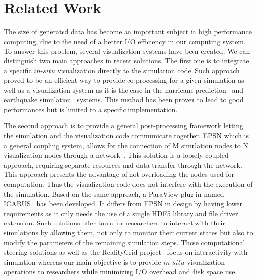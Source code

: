 \section{Related Work}
\label{sec:related}

The size of generated data has become an important subject in high performance 
computing, due to the need of a better I/O efficiency in our computing 
system. To answer this problem, several visualization systems have been created.
We can distinguish two main approaches in recent solutions. The first one is to 
integrate a specific $in$-$situ$ visualization directly to the simulation code. 
Such approach proved to be an efficient way to provide co-processing for a given
simulation as well as a visualization system as it is the case in the hurricane
prediction~\cite{4015457} and earthquake simulation~\cite{4090186} systems.
This method has been proven to lead to good performances but is limited 
to a specific implementation.

The second approach is to provide a general post-processing framework letting the
simulation and the visualization code communicate together. EPSN which is a
general coupling system, allows for the connection of M simulation nodes to N
visualization nodes through a network~\cite{4020782}. This solution is a
loosely coupled approach, requiring separate resources and data transfer
through the network. This approach presents the advantage of not overloading
the nodes used for computation. Thus the visualization code does not interfere
with the execution of the simulation. Based on the same approach, a ParaView
plug-in named ICARUS~\cite{6152102} has been developed. 
It differs from EPSN in design by having lower requirements as it only needs
the use of a single HDF5 library and file driver extension. Such solutions
offer tools for researchers to interact with their simulations by allowing
them, not only to monitor their current states but also to modify
the parameters of the remaining simulation steps. Those computational steering
solutions as well as the RealityGrid
project~\cite{Harting03computationalsteering} focus on interactivity with
simulation whereas our main objective is to provide $in$-$situ$ visualization
operations to researchers while minimizing I/O overhead and disk
space use. 

